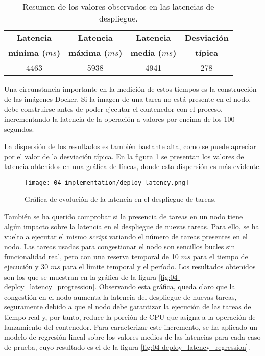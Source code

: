 \begin{table}
    \centering
    \begin{tabular}{ | c | c | c | c | }
        \hline
        \textbf{Latencia}      & \textbf{Latencia}      & \textbf{Latencia}     & \textbf{Desviación} \\
        \textbf{mínima ($ms$)} & \textbf{máxima ($ms$)} & \textbf{media ($ms$)} & \textbf{típica}     \\
        \hline
        4463                   & 5938                   & 4941                  & 278                 \\
        \hline
    \end{tabular}
    \caption{Resumen de los valores observados en las latencias de despliegue.}
    \label{tab:04-deploy_latency}
\end{table}

Una circunstancia importante en la medición de estos tiempos es la construcción
de las imágenes Docker. Si la imagen de una tarea no está presente en el nodo, debe
construirse antes de poder ejecutar el contenedor con el proceso, incrementando
la latencia de la operación a valores por encima de los 100 segundos.

La dispersión de los resultados es también bastante alta, como se puede apreciar
por el valor de la desviación típica. En la figura \ref{fig:04-deploy_latency} se
presentan los valores de latencia obtenidos en una gráfica de líneas, donde esta
dispersión es más evidente.

\begin{figure}
    \centering
    \texttt{[image: 04-implementation/deploy-latency.png]}
    \caption{Gráfica de evolución de la latencia en el despliegue de tareas.}
    \label{fig:04-deploy_latency}
\end{figure}

También se ha querido comprobar si la presencia de tareas en un nodo tiene algún
impacto sobre la latencia en el despliegue de nuevas tareas. Para ello, se ha
vuelto a ejecutar el mismo \textit{script} variando el número de tareas
presentes en el nodo. Las tareas usadas para congestionar el nodo son sencillos
bucles sin funcionalidad real, pero con una reserva temporal de 10 $ms$ para el
tiempo de ejecución y 30 $ms$ para el límite temporal y el período. Los
resultados obtenidos son los que se muestran en la gráfica de la figura
\ref{fig:04-deploy_latency_progression}. Observando esta gráfica, queda claro
que la congestión en el nodo aumenta la latencia del despliegue de nuevas
tareas, seguramente debido a que el nodo debe garantizar la ejecución de las
tareas de tiempo real y, por tanto, reduce la porción de CPU que asigna a la
operación de lanzamiento del contenedor. Para caracterizar este incremento, se
ha aplicado un modelo de regresión lineal sobre los valores medios de las
latencias para cada caso de prueba, cuyo resultado es el de la figura
\ref{fig:04-deploy_latency_regression}.

